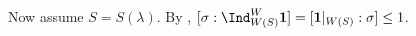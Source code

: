 \documentclass[12pt,a4paper]{amsart}
\makeatletter
\newcommand{\bfone}{\mathbf{1}}
\def\inn#1#2{\left\langle
      \def\ta{#1}\def\tb{#2}
      \ifx\ta\@empty{\;} \else {\ta}\fi ,
      \ifx\tb\@empty{\;} \else {\tb}\fi
      \right\rangle}
\numberwithin{equation}{section}
\theoremstyle{remark}
\def\Gc{G_\bC}
\def\hha{{}^a\fhh}
\def\aX{{}^aX}
\def\aQ{{}^aQ}
\def\aP{{}^aP}
\def\aR{{}^aR}
\def\Gfin{\cG(\Gc)}
\def\PiGfin{\Pi_{\mathrm{fin}}( \Gc )}
\def\PiGlfin{\Pi_{\Lambda_0}( \Gc )}
\def\WT#1{\Delta(#1)}
\def\Rlam{R_{[\lambda]}}
\def\Glfin{\cG_{\Lambda}(\Gc)}
\def\AND{\quad \text{and} \quad}
\makeatother
\begin{document}
{Now assume $S=S(\lambda)$. By \cite[Cor~5.30 b) and c)]{BVUni},
$[\sigma: \Ind_{W(S)}^{W}\bfone]=[\bfone|_{W(S)}:\sigma]\leq 1$.

}












\end{document}

